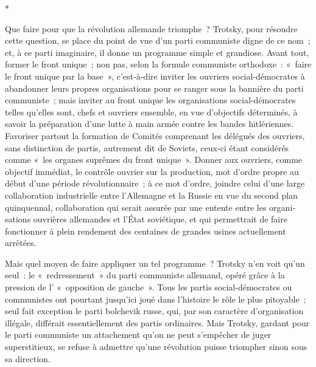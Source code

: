 \documentclass[french,twoside]{book} %
\begin{document}
\begin{center}
*\end{center}
\noindent \par
Que faire pour que la révolution allemande triomphe ? Trotsky, pour résoudre cette question, se place du point de vue d'un parti communiste digne de ce nom ; et, à ce parti imaginaire, il donne un programme simple et gran­diose. Avant tout, former le front unique ; non pas, selon la formule communiste orthodoxe : « faire le front unique par la base », c'est-à-dire inviter les ouvriers social-démocrates à abandonner leurs propres organisa­tions pour se ranger sous la bannière du parti communiste ; mais inviter au front unique les organisations social-démocrates telles qu'elles sont, chefs et ouvriers ensemble, en vue d'objectifs déterminés, à savoir la préparation d'une lutte à main armée contre les bandes hitlériennes. Favoriser partout la forma­tion de Comités comprenant les délégués des ouvriers, sans distinction de partis, autrement dit de Soviets, ceux-ci étant considérés comme « les organes suprêmes du front unique ». Donner aux ouvriers, comme objectif immédiat, le contrôle ouvrier sur la production, mot d'ordre propre au début d'une période révolutionnaire ; à ce mot d'ordre, joindre celui d'une large collabo­ration industrielle entre l'Allemagne et la Russie en vue du second plan quinquennal, collaboration qui serait assurée par une entente entre les organi­sations ouvrières allemandes et l'État soviétique, et qui permettrait de faire fonctionner à plein rendement des centaines de grandes usines actuellement arrêtées.\par
Mais quel moyen de faire appliquer un tel programme ? Trotsky n'en voit qu'un seul : le « redressement » du parti communiste allemand, opéré grâce à la pression de l' « opposition de gauche ». Tous les partis social-démocrates ou communistes ont pourtant jusqu'ici joué dans l'histoire le rôle le plus pitoyable ; seul fait exception le parti bolchevik russe, qui, par son caractère d'organisation illégale, différait essentiellement des partis ordinaires. Mais Trotsky, gardant pour le parti communiste un attachement qu'on ne peut s'em­pêcher de juger superstitieux, se refuse à admettre qu'une révolution puisse triompher sinon sous sa direction.\par
\end{document}
